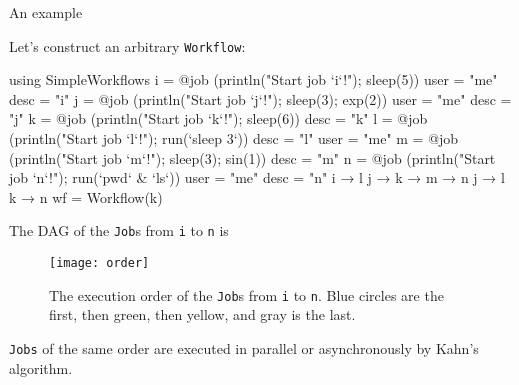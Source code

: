 \begin{frame}{An example}

    Let's construct an arbitrary \texttt{Workflow}:
    {\scriptsize
    \begin{algorithmblock}
        \begin{juliaverbatim}
            using SimpleWorkflows
            i = @job (println("Start job `i`!"); sleep(5)) user = "me" desc = "i"
            j = @job (println("Start job `j`!"); sleep(3); exp(2)) user = "me" desc = "j"
            k = @job (println("Start job `k`!"); sleep(6)) desc = "k"
            l = @job (println("Start job `l`!"); run(`sleep 3`)) desc = "l" user = "me"
            m = @job (println("Start job `m`!"); sleep(3); sin(1)) desc = "m"
            n = @job (println("Start job `n`!"); run(`pwd` & `ls`)) user = "me" desc = "n"
            i → l
            j → k → m → n
            j → l
            k → n
            wf = Workflow(k)
        \end{juliaverbatim}
    \end{algorithmblock}
    }

    \framebreak

    The DAG of the \texttt{Job}s from \texttt{i} to \texttt{n} is

    \begin{figure}[H]
        \centering
        \texttt{[image: order]}
        \caption{The execution order of the \texttt{Job}s from \texttt{i} to \texttt{n}.
            Blue circles are the first, then green, then yellow, and gray is the last.}
        \label{fig:order}
    \end{figure}

    \texttt{Jobs} of the same order are executed in parallel or asynchronously by
    Kahn's algorithm.

\end{frame}
